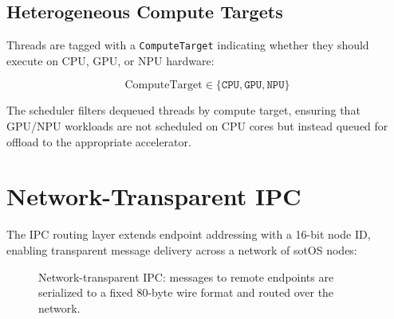 \documentclass[11pt,letterpaper]{article}
\theoremstyle{definition}
\begin{document}
\subsection{Heterogeneous Compute Targets}

Threads are tagged with a \texttt{ComputeTarget} indicating whether they
should execute on CPU, GPU, or NPU hardware:

\begin{equation}
\text{ComputeTarget} \in \{\texttt{CPU}, \texttt{GPU}, \texttt{NPU}\}
\end{equation}

The scheduler filters dequeued threads by compute target, ensuring that
GPU/NPU workloads are not scheduled on CPU cores but instead queued for
offload to the appropriate accelerator.

\section{Network-Transparent IPC}
\label{sec:swarm}

The IPC routing layer extends endpoint addressing with a 16-bit node ID,
enabling transparent message delivery across a network of sotOS nodes:

\begin{figure}[h]
\centering
{}
\caption{Network-transparent IPC: messages to remote endpoints are
serialized to a fixed 80-byte wire format and routed over the network.}
\label{fig:swarm}
\end{figure}
\end{document}
